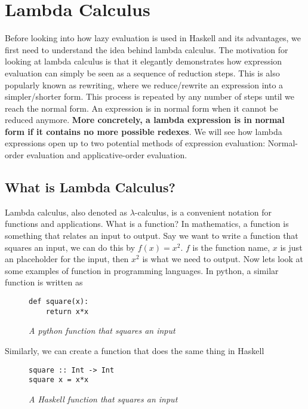 \documentclass{article}
\begin{document}
\section{Lambda Calculus}


\medskip\noindent
Before looking into how lazy evaluation is used in Haskell and its advantages, we first need to understand the idea behind lambda calculus. The motivation for looking at lambda calculus is that it elegantly demonstrates how expression evaluation can simply be seen as a sequence of reduction steps. This is also popularly known as rewriting, where we reduce/rewrite an expression into a simpler/shorter form. This process is repeated by any number of steps until we reach the normal form. An expression is in normal form when it cannot be reduced anymore. \textbf{More concretely, a lambda expression is in normal form if it contains no more possible redexes}. We will see how lambda expressions open up to two potential methods of expression evaluation: Normal-order evaluation and applicative-order evaluation.

\subsection{What is Lambda Calculus?}
Lambda calculus, also denoted as $\lambda$-calculus, is a convenient notation for functions and applications. What is a function? In mathematics, a function is something that relates an input to output. Say we want to write a function that squares an input, we can do this by $f(x) = {x}^2$. $f$ is the function name, $x$ is just an placeholder for the input, then ${x}^2$ is what we need to output. Now lets look at some examples of function in programming languages. In python, a similar function is written as
\begin{figure}[!htb]
    \begin{lstlisting}
def square(x):
    return x*x
    \end{lstlisting}
    \caption{\textit{A python function that squares an input}}
\end{figure}

\medskip\noindent
Similarly, we can create a function that does the same thing in Haskell

\begin{figure}[H]
    \begin{lstlisting}
square :: Int -> Int
square x = x*x
    \end{lstlisting}
    \caption{\textit{A Haskell function that squares an input}}
\end{figure}
\end{document}
